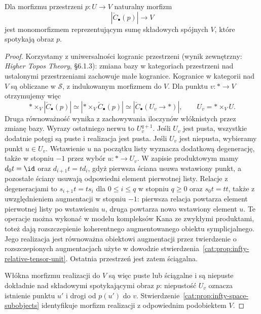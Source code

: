 \begin{stwierdzenie}\label{cat:prop:infty-cech-space-image}
Dla morfizmu przestrzeni $p:U\to V$ naturalny morfizm
\[
 \left|\check C_\bullet(p)\right|\longrightarrow V
\]
jest monomorfizmem reprezentującym sumę składowych spójnych $V$, które spotykają obraz $p$.
\end{stwierdzenie}
\begin{proof}
Korzystamy z uniwersalności kogranic przestrzeni (wynik zewnętrzny: \emph{Higher Topos Theory}, \S6.1.3): zmiana bazy w kategoriach przestrzeni nad ustalonymi przestrzeniami zachowuje małe kogranice. Kogranice w kategorii nad $V$ są obliczane w $\mathcal S$, z indukowanym morfizmem do $V$. Dla punktu $v:*\to V$ otrzymujemy więc
\[
 *\times_V|\check C_\bullet(p)|
 \simeq
 \left|*\times_V\check C_\bullet(p)\right|
 \simeq
 \left|\check C_\bullet(U_v\to*)\right|,
 \qquad U_v=*\times_VU.
\]
Druga równoważność wynika z zachowywania iloczynów włóknistych przez zmianę bazy. Wyrazy ostatniego nerwu to $U_v^{q+1}$. Jeśli $U_v$ jest pusta, wszystkie dodatnie potęgi są puste i realizacja jest pusta. Jeśli $U_v$ jest niepusta, wybieramy punkt $u\in U_v$. Wstawienie $u$ na początku listy wyznacza dodatkową degenerację, także w stopniu $-1$ przez wybór $u:*\to U_v$. W zapisie produktowym mamy $d_0t=\id$ oraz $d_{i+1}t=td_i$, gdyż pierwsza ściana usuwa wstawiony punkt, a pozostałe ściany usuwają odpowiedni element pierwotnej listy. Relacje z degeneracjami to $s_{i+1}t=ts_i$ dla $0\leq i\leq q$ w stopniu $q\geq0$ oraz $s_0t=tt$, także z uwzględnieniem augmentacji w stopniu $-1$: pierwsza relacja powtarza element pierwotnej listy po wstawieniu $u$, druga powtarza nowo wstawiony element $u$.  Te operacje można wykonać w modelu kompleksów Kana ze zwykłymi produktami, toteż dają rozszczepienie koherentnego augmentowanego obiektu symplicjalnego. Jego realizacja jest równoważna obiektowi augmentacji przez twierdzenie o rozszczepionych augmentacjach użyte w dowodzie stwierdzenia~\ref{cat:prop:infty-relative-tensor-unit}. Ostatnia przestrzeń jest zatem ściągalna.

Włókna morfizmu realizacji do $V$ są więc puste lub ściągalne i są niepuste dokładnie nad składowymi spotykającymi obraz $p$: niepustość $U_v$ oznacza istnienie punktu $u'$ i drogi od $p(u')$ do $v$. Stwierdzenie~\ref{cat:prop:infty-space-subobjects} identyfikuje morfizm realizacji z odpowiednim podobiektem $V$.
\end{proof}

